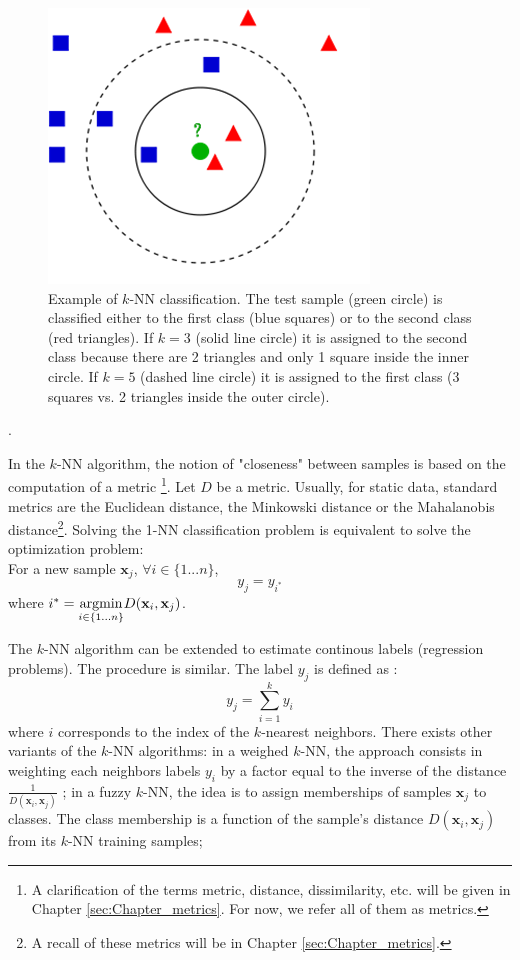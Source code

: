 \begin{figure}[h!]
\centering
\includegraphics[width=0.4\linewidth]{images/kNN_example}
\caption{Example of $k$-NN classification. The test sample (green circle) is classified either to the first class (blue squares) or to the second class (red triangles). If $k = 3$ (solid line circle) it is assigned to the second class because there are 2 triangles and only 1 square inside the inner circle. If $k = 5$ (dashed line circle) it is assigned to the first class (3 squares vs. 2 triangles inside the outer circle).}
\label{fig:kNN_example}
\end{figure}

.

\noindent In the $k$-NN algorithm, the notion of "closeness" between samples is based on the computation of a metric \footnote{A clarification of the terms metric, distance, dissimilarity, etc. will be given in Chapter \ref{sec:Chapter_metrics}. For now, we refer all of them as metrics.}. Let $D$ be a metric. Usually, for static data, standard metrics are the Euclidean distance, the Minkowski distance or the Mahalanobis distance\footnote{A recall of these metrics will be in Chapter \ref{sec:Chapter_metrics}.}. Solving the 1-NN classification problem is equivalent to solve the optimization problem: \\
\noindent For a new sample $\textbf{x}_j$, $\forall i \in \{1...n\}$,
\begin{equation}
y_j = y_{i^*}
\end{equation}
where $i^*={\underset{i \in \{1...n\}}{\argmin}   D(\textbf{x}_i,\textbf{x}_j)}$.

The $k$-NN algorithm can be extended to estimate continous labels (regression problems). The procedure is similar. The label $y_j$ is defined as :
\begin{equation}
y_j = \sum_{i=1}^{k} y_{i}
\end{equation}
where $i$ corresponds to the index of the $k$-nearest neighbors. There exists other variants of the $k$-NN algorithms: in a weighed $k$-NN, the approach consists in weighting each neighbors labels $y_{i}$ by a factor equal to the inverse of the distance $\frac{1}{D(\textbf{x}_i, \textbf{x}_j)}$ ; in a fuzzy $k$-NN, the idea is to assign memberships of samples $\textbf{x}_j$ to classes. The class membership is a function of the sample’s distance $D(\textbf{x}_i, \textbf{x}_j)$ from its $k$-NN training samples; 

